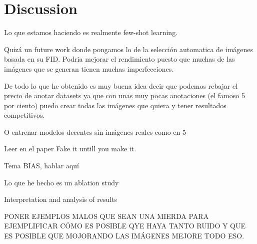 \chapter{Discussion} \label{sec:discussion}

Lo que estamos haciendo es realmente few-shot learning.

Quizá un future work donde pongamos  lo de la selección automatica de imágenes basada en su FID. Podria mejorar el rendimiento puesto que muchas de las imágenes que se generan tienen muchas imperfecciones.

De todo lo que he obtenido es muy buena idea decir que podemos rebajar el precio de anotar datasets ya que con unas muy pocas anotaciones (el famoso 5 por ciento) puedo crear todas las imágenes que quiera y tener resultados competitivos. 

O entrenar modelos decentes sin imágenes reales como en 5

Leer en el paper Fake it untill you make it.

Tema BIAS, hablar aquí

Lo que he hecho es un ablation study

Interpretation and analysis of results


PONER EJEMPLOS MALOS QUE SEAN UNA MIERDA PARA EJEMPLIFICAR CÓMO ES POSIBLE QYE HAYA TANTO RUIDO Y QUE ES POSIBLE QUE MOJORANDO LAS IMÁGENES MEJORE TODO ESO.
